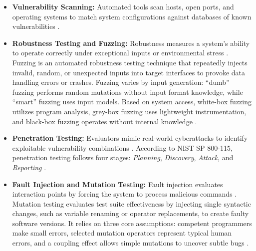 \begin{itemize}
	\item \textbf{Vulnerability Scanning:} Automated tools scan hosts, open ports, and operating systems to match system configurations against databases of known vulnerabilities \cite[p. 27]{nist_sp800_115}.
	
	\item \textbf{Robustness Testing and Fuzzing:} Robustness measures a system's ability to operate correctly under exceptional inputs or environmental stress \cite[p. 39]{richier2011security}. Fuzzing is an automated robustness testing technique that repeatedly injects invalid, random, or unexpected inputs into target interfaces to provoke data handling errors or crashes. Fuzzing varies by input generation: ``dumb'' fuzzing performs random mutations without input format knowledge, while ``smart'' fuzzing uses input models. Based on system access, white-box fuzzing utilizes program analysis, grey-box fuzzing uses lightweight instrumentation, and black-box fuzzing operates without internal knowledge \cite[p. 8]{cong2024overview} \cite[p. 29]{richier2011security}.
	
	\item \textbf{Penetration Testing:} Evaluators mimic real-world cyberattacks to identify exploitable vulnerability combinations \cite[p. 296]{tauqeer2021analysis}. According to NIST SP 800-115, penetration testing follows four stages: \textit{Planning}, \textit{Discovery}, \textit{Attack}, and \textit{Reporting} \cite[p. 37]{nist_sp800_115}.
	
	\item \textbf{Fault Injection and Mutation Testing:} Fault injection evaluates interaction points by forcing the system to process malicious commands \cite[p. 296]{tauqeer2021analysis}. Mutation testing evaluates test suite effectiveness by injecting single syntactic changes, such as variable renaming or operator replacements, to create faulty software versions. It relies on three core assumptions: competent programmers make small errors, selected mutation operators represent typical human errors, and a coupling effect allows simple mutations to uncover subtle bugs \cite[p. 50]{richier2011security}.
\end{itemize}


	
	
	





